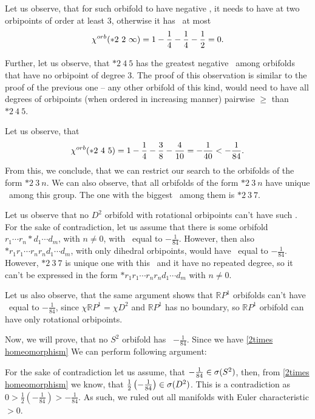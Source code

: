 Let us observe, that for such orbifold to have negative \Eoc, it needs to have at two orbipoints 
of order at least $3$, otherwise it has \Eoc\ at most 
\begin{equation}
\cho{*2\ 2\ \infty} = 1- \frac{1}{4} - \frac{1}{4} - \frac{1}{2} = 0. 
\end{equation}

Further, let us observe, that $*2\ 4\ 5$ has the greatest negative \Eoc\ among orbifolds 
that have no orbipoint of degree $3$. The proof of this observation is similar to the proof 
of the previous one -- any other orbifold of this kind, 
would need to have all degrees of orbipoints (when ordered in increasing manner) 
pairwise $\geq$ than $*2\ 4\ 5$.

Let us observe, that
\begin{equation}
{\chi^{orb}(*2\ 4\ 5)} = 1 - \frac{1}{4} - \frac{3}{8} - \frac{4}{10} = -\frac{1}{40} < - \frac{1}{84}. 
\end{equation}
From this, we conclude, that we can restrict our search to the orbifolds of 
the form $*2\ 3\ n$. 
We can also observe, that all orbifolds of the form $*2\ 3\ n$ have unique \Eoc\ 
among this group.
The one with the biggest \Eoc\ among them is $*2\ 3\ 7$. 

Let us observe that no $D^2$ orbifold with rotational orbipoints can't have such \Eoc. 
For the sake of contradiction, let us assume that there is some orbifold 
$r_1 \cdots r_n * d_1 \cdots d_m$, with $n\neq 0$, with \Eoc\ equal to $-\frac{1}{84}$. 
However, then also $*r_1r_1 \cdots r_nr_nd_1\cdots d_m$, 
with only dihedral orbipoints, 
would have \Eoc\ equal to $-\frac{1}{84}$. However, $*2\ 3\ 7$ is unique one with this \Eoc\ 
and it have no repeated degree, so it can't be expressed in the form 
$*r_1r_1 \cdots r_nr_nd_1\cdots d_m$ 
with $n\neq 0$. 

Let us also observe, that the same argument shows that $\mathbb{R}P^1$ orbifolds 
can't have \Eoc\ equal to $-\frac{1}{84}$, since $\chi{\mathbb{R}P^1} = \chi{D^2}$ 
and $\mathbb{R}P^1$ has no boundary, so $\mathbb{R}P^1$ orbifold can have only rotational 
orbipoints. 
 
Now, we will prove, that no $S^2$ orbifold has \Eoc\ $-\frac{1}{84}$. 
Since we have \ref{2times homeomorphism} 
We can perform following argument:  
 
For the sake of contradiction let us assume, that 
$-\frac{1}{84} \in {{\sigma}(S^2)}$, then, from \ref{2times homeomorphism} we know, that 
$\frac{1}{2}\left(-\frac{1}{84}\right)\in {{\sigma}(D^2)}$. This is a contradiction as 
$0 > \frac{1}{2}\left(-\frac{1}{84}\right) > -\frac{1}{84}$. 
As such, we ruled out all manifolds with Euler characteristic $>0$. 

